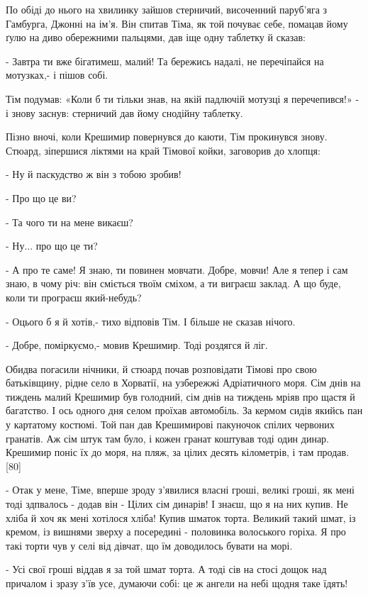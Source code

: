 По обіді до нього на хвилинку зайшов стерничий, височенний паруб'яга з Гамбурга, Джонні на ім'я. Він спитав Тіма, як той почуває себе, помацав йому ґулю на диво обережними пальцями, дав іще одну таблетку й сказав:

- Завтра ти вже бігатимеш, малий! Та бережись надалі, не перечіпайся на мотузках,- і пішов собі.

Тім подумав: «Коли б ти тільки знав, на якій падлючій мотузці я перечепився!» - і знову заснув: стерничий дав йому снодійну таблетку.

Пізно вночі, коли Крешимир повернувся до каюти, Тім прокинувся знову. Стюард, зіпершися ліктями на край Тімової койки, заговорив до хлопця:

- Ну й паскудство ж він з тобою зробив!

- Про що це ви?

- Та чого ти на мене викаєш?

- Ну... про що це ти?

- А про те саме! Я знаю, ти повинен мовчати. Добре, мовчи! Але я тепер і сам знаю, в чому річ: він сміється твоїм сміхом, а ти виграєш заклад. А що буде, коли ти програєш який-небудь?

- Оцього б я й хотів,- тихо відповів Тім. І більше не сказав нічого.

- Добре, поміркуємо,- мовив Крешимир. Тоді роздягся й ліг.

Обидва погасили нічники, й стюард почав розповідати Тімові про свою батьківщину, рідне село в Хорватії, на узбережжі Адріатичного моря. Сім днів на тиждень малий Крешимир був голодний, сім днів на тиждень мріяв про щастя й багатство. І ось одного дня селом проїхав автомобіль. За кермом сидів якийсь пан у картатому костюмі. Той пан дав Крешимирові пакуночок спілих червоних гранатів. Аж сім штук там було, і кожен гранат коштував тоді один динар. Крешимир поніс їх до моря, на пляж, за цілих десять кілометрів, і там продав. [80]

- Отак у мене, Тіме, вперше зроду з'явилися власні гроші, великі гроші, як мені тоді здпвалось - додав він - Цілих сім динарів! І знаєш, що я на них купив. Не хліба й хоч як мені хотілося хліба! Купив шматок торта. Великий такий шмат, із кремом, із вишнями зверху а посередині - половинка волоського горіха. Я про такі торти чув у селі від дівчат, що їм доводилось бувати на морі.

- Усі свої гроші віддав я за той шмат торта. А тоді сів на стосі дощок над причалом і зразу з’їв усе, думаючи собі: це ж ангели на небі щодня таке їдять!

